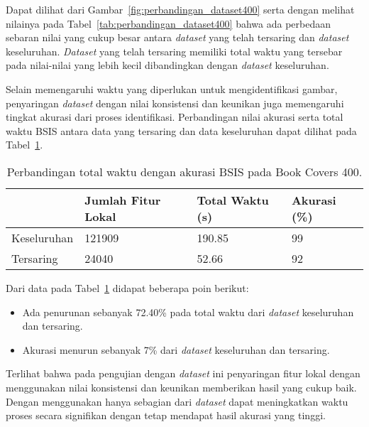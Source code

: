 Dapat dilihat dari Gambar~\ref{fig:perbandingan_dataset400} serta dengan melihat nilainya pada Tabel~\ref{tab:perbandingan_dataset400} bahwa ada perbedaan sebaran nilai yang cukup besar antara \textit{dataset} yang telah tersaring dan \textit{dataset} keseluruhan. \textit{Dataset} yang telah tersaring memiliki total waktu yang tersebar pada nilai-nilai yang lebih kecil dibandingkan dengan \textit{dataset} keseluruhan. 

Selain memengaruhi waktu yang diperlukan untuk mengidentifikasi gambar, penyaringan \textit{dataset} dengan nilai konsistensi dan keunikan juga memengaruhi tingkat akurasi dari proses identifikasi. Perbandingan nilai akurasi serta total waktu BSIS antara data yang tersaring dan data keseluruhan dapat dilihat pada Tabel~\ref{tab:waktu_akurasi_dataset400}.
\begin{table}[H]
	\centering
	\begin{tabular}{|l|l|l|l|}
		\hline
		& \textbf{Jumlah Fitur Lokal} & \textbf{Total Waktu (s)} & \textbf{Akurasi (\%)} \\ \hline
		Keseluruhan & 121909 & 190.85                   & 99                    \\ \hline
		Tersaring   & 24040 & 52.66                    & 92                    \\ \hline
	\end{tabular}
	\caption{Perbandingan total waktu dengan akurasi BSIS pada Book Covers 400.}
	\label{tab:waktu_akurasi_dataset400}
\end{table}
Dari data pada Tabel~\ref{tab:waktu_akurasi_dataset400} didapat beberapa poin berikut:
\begin{itemize}
	\item Ada penurunan sebanyak 72.40\% pada total waktu dari \textit{dataset} keseluruhan dan tersaring.
	\item Akurasi menurun sebanyak 7\% dari \textit{dataset} keseluruhan dan tersaring.
\end{itemize}
Terlihat bahwa pada pengujian dengan \textit{dataset} ini penyaringan fitur lokal dengan menggunakan nilai konsistensi dan keunikan memberikan hasil yang cukup baik. Dengan menggunakan hanya sebagian dari \textit{dataset} dapat meningkatkan waktu proses secara signifikan dengan tetap mendapat hasil akurasi yang tinggi.

\vspace{-10pt}
